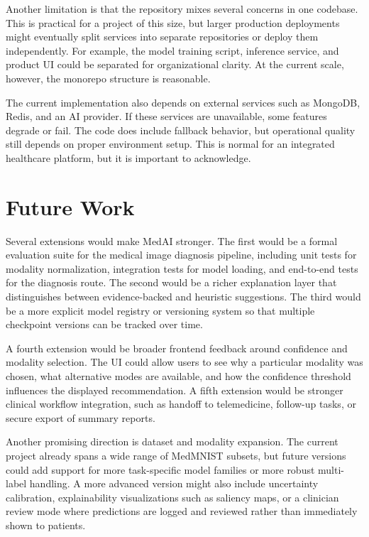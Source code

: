 \documentclass[conference]{IEEEtran}
\begin{document}
Another limitation is that the repository mixes several concerns in one codebase. This is practical for a project of this size, but larger production deployments might eventually split services into separate repositories or deploy them independently. For example, the model training script, inference service, and product UI could be separated for organizational clarity. At the current scale, however, the monorepo structure is reasonable.

The current implementation also depends on external services such as MongoDB, Redis, and an AI provider. If these services are unavailable, some features degrade or fail. The code does include fallback behavior, but operational quality still depends on proper environment setup. This is normal for an integrated healthcare platform, but it is important to acknowledge.

\section{Future Work}
Several extensions would make MedAI stronger. The first would be a formal evaluation suite for the medical image diagnosis pipeline, including unit tests for modality normalization, integration tests for model loading, and end-to-end tests for the diagnosis route. The second would be a richer explanation layer that distinguishes between evidence-backed and heuristic suggestions. The third would be a more explicit model registry or versioning system so that multiple checkpoint versions can be tracked over time.

A fourth extension would be broader frontend feedback around confidence and modality selection. The UI could allow users to see why a particular modality was chosen, what alternative modes are available, and how the confidence threshold influences the displayed recommendation. A fifth extension would be stronger clinical workflow integration, such as handoff to telemedicine, follow-up tasks, or secure export of summary reports.

Another promising direction is dataset and modality expansion. The current project already spans a wide range of MedMNIST subsets, but future versions could add support for more task-specific model families or more robust multi-label handling. A more advanced version might also include uncertainty calibration, explainability visualizations such as saliency maps, or a clinician review mode where predictions are logged and reviewed rather than immediately shown to patients.
\end{document}
